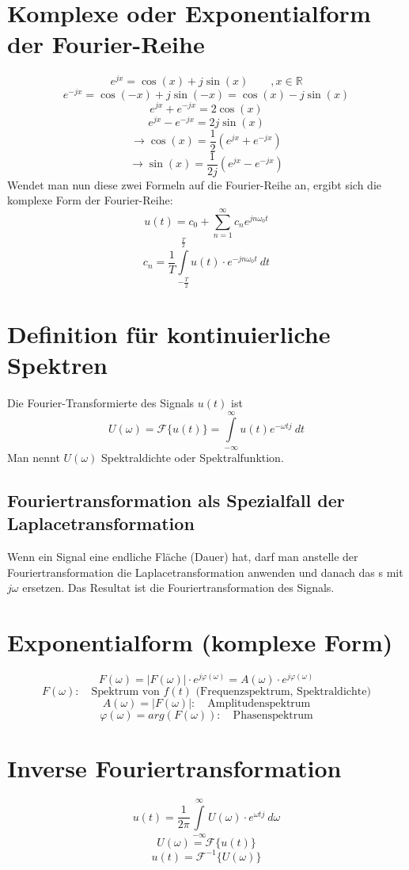 \section{Komplexe oder Exponentialform der Fourier-Reihe}
\[ e^{j x} = \cos(x) + j \sin(x) \qquad , x \in \mathbb{R} \]
\[ e^{- j x} = \cos(-x) + j \sin(-x) = \cos(x) - j \sin(x) \]
\[ e^{jx} + e^{-jx} = 2 \cos(x) \]
\[ e^{jx} - e^{-jx} = 2 j \sin(x) \]
\[ \to \cos(x) = \frac{1}{2} (e^{jx} + e^{-jx}) \]
\[ \to \sin(x) = \frac{1}{2j} (e^{jx} - e^{-jx}) \]
Wendet man nun diese zwei Formeln auf die Fourier-Reihe an, ergibt sich die komplexe Form der Fourier-Reihe:
\[ u(t) = c_0 + \sum\limits_{n = 1}^{\infty} c_n e^{j n \omega_0 t} \]
\[ c_n = \frac{1}{T} \int\limits_{-\frac{T}{2}}^{\frac{T}{2}} 
u(t) \cdot e^{-j n \omega_0 t} ~ dt \]



\section{Definition für kontinuierliche Spektren}
 Die Fourier-Transformierte des Signals $u(t)$ ist 
\[ U(\omega) = \mathcal{F}\{ u(t) \} = \int\limits_{-\infty}^{\infty} 
u(t) e^{-\omega t j} ~dt \]
Man nennt $U(\omega)$ Spektraldichte oder Spektralfunktion.\\

\subsection{Fouriertransformation als Spezialfall der Laplacetransformation}
Wenn ein Signal eine endliche Fläche (Dauer) hat, darf man anstelle der Fouriertransformation
die Laplacetransformation anwenden und danach das s mit $j\omega$ ersetzen. Das Resultat ist die Fouriertransformation des Signals.

\section{Exponentialform (komplexe Form)}
\[ \boxed{F(\omega) = |F(\omega)| \cdot e^{j\varphi(\omega)} = A(\omega) \cdot e^{j\varphi(\omega)}}   \]
\[ F(\omega): \quad \text{Spektrum von $f(t)$ (Frequenzspektrum, Spektraldichte)} \]
\[ A(\omega) = |F(\omega)|: \quad \text{Amplitudenspektrum} \]
\[ \varphi (\omega) = arg(F(\omega)): \quad \text{Phasenspektrum} \]

\section{Inverse Fouriertransformation}
\[ u(t) = \frac{1}{2 \pi}  \int\limits_{-\infty}^{\infty} U(\omega) \cdot e^{\omega t j} ~ d\omega \]
\[ U(\omega) = \mathcal{F} \{ u(t) \} \]
\[ u(t) = \mathcal{F}^{-1} \{ U(\omega) \} \]

